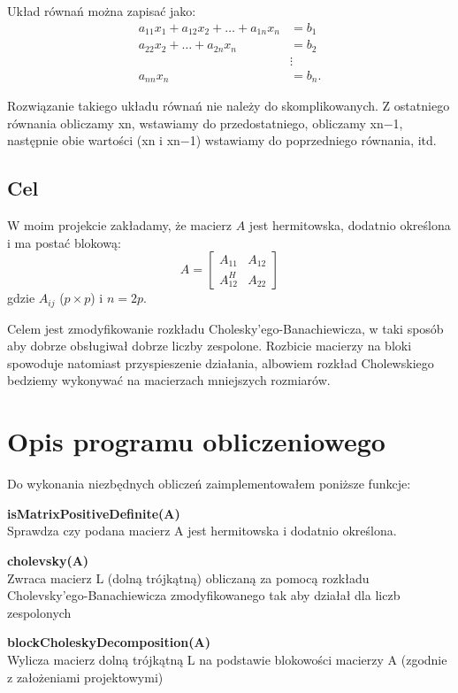 \documentclass{article}
\begin{document}
Układ równań można zapisać jako:
\begin{align*}
a_{11}x_1 + a_{12}x_2 + \dots + a_{1n}x_n &= b_1 \\
a_{22}x_2 + \dots + a_{2n}x_n &= b_2 \\
&\vdots \\
a_{nn}x_n &= b_n.
\end{align*}

Rozwiązanie takiego układu równań nie należy do skomplikowanych. Z ostatniego równania obliczamy xn, wstawiamy do przedostatniego, obliczamy xn−1, następnie obie wartości (xn i
xn−1) wstawiamy do poprzedniego równania, itd.

\subsection*{Cel}
W moim projekcie zakładamy, że macierz $A$ jest hermitowska, dodatnio określona i ma postać blokową:
\[ A = \begin{bmatrix} A_{11} & A_{12} \\ A_{12}^H & A_{22} \end{bmatrix} \]
gdzie $A_{ij}$ ($p \times p$) i $n = 2p$.

Celem jest zmodyfikowanie rozkładu Cholesky'ego-Banachiewicza, w taki sposób aby dobrze obsługiwał dobrze liczby zespolone. Rozbicie macierzy na bloki spowoduje natomiast przyspieszenie działania, albowiem rozkład Cholewskiego bedziemy wykonywać na macierzach mniejszych rozmiarów.

\section{Opis programu obliczeniowego}

Do wykonania niezbędnych obliczeń zaimplementowałem poniższe funkcje:

\vspace{12pt}
\textbf{\large isMatrixPositiveDefinite(A)} \\
Sprawdza czy podana macierz A jest hermitowska i dodatnio określona.

\vspace{6pt}
\textbf{\large cholevsky(A)} \\
Zwraca macierz L (dolną trójkątną) obliczaną za pomocą rozkładu Cholevsky'ego-Banachiewicza zmodyfikowanego tak aby działał dla liczb zespolonych

\vspace{6pt}
\textbf{\large blockCholeskyDecomposition(A)} \\
Wylicza macierz dolną trójkątną L na podstawie blokowości macierzy A (zgodnie z założeniami projektowymi)
\end{document}
